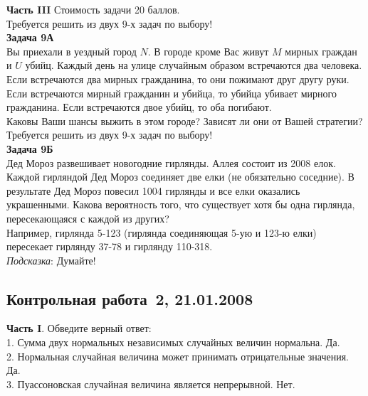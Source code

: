 \documentclass[pdftex,12pt,a4paper]{article}
\begin{document}
\textbf{Часть III} Стоимость задачи 20 баллов. \\

Требуется решить \textbf{} из двух 9-х задач по
выбору! \\


\textbf{Задача 9А} \\
Вы приехали в уездный город $N$. В городе кроме Вас живут $M$ мирных граждан и $U$ убийц. Каждый день на улице случайным образом встречаются два человека. Если встречаются два мирных гражданина, то они пожимают друг другу руки. Если встречаются мирный гражданин и убийца, то убийца убивает мирного гражданина. Если встречаются двое убийц, то оба погибают. \\
Каковы Ваши шансы выжить в этом городе? Зависят ли они от Вашей стратегии?  \\



Требуется решить \textbf{} из двух 9-х задач по
выбору! \\



\textbf{Задача 9Б} \\
Дед Мороз развешивает новогодние гирлянды. Аллея состоит из 2008 елок. Каждой гирляндой Дед Мороз соединяет две елки (не обязательно соседние). В результате Дед Мороз повесил 1004 гирлянды и все елки оказались украшенными. Какова вероятность того, что существует хотя бы одна гирлянда, пересекающаяся с каждой из других? \\
Например, гирлянда 5-123 (гирлянда соединяющая 5-ую и 123-ю елки) пересекает гирлянду 37-78 и гирлянду 110-318. \\

\emph{Подсказка}: Думайте! \\


\subsection{Контрольная работа \No\,2, 21.01.2008}

\textbf{Часть I}. Обведите верный ответ: \\

1. Сумма двух нормальных независимых случайных величин нормальна.
Да. \\

2. Нормальная случайная величина может принимать отрицательные
значения. Да. \\

3. Пуассоновская случайная величина является непрерывной. Нет.
\\
\end{document}

